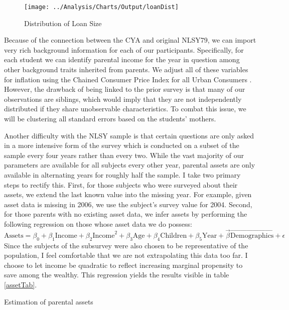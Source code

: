 \documentclass[12pt]{article}
\begin{document}
	\begin{figure}
		\centering
		\caption{Distribution of Loan Size}
		\label{loanDist}
		\texttt{[image: ../Analysis/Charts/Output/loanDist]}
	\end{figure}

	
	Because of the connection between the CYA and original NLSY79, we can import very rich background information for each of our participants. Specifically, for each student we can identify parental income for the year in question among other background traits inherited from parents. We adjust all of these variables for inflation using the Chained Consumer Price Index for all Urban Consumers \parencite{bls2019}. However, the drawback of being linked to the prior survey is that many of our observations are siblings, which would imply that they are not independently distributed if they share unobservable characteristics. To combat this issue, we will be clustering all standard errors based on the students' mothers. 
	
	Another difficulty with the NLSY sample is that certain questions are only asked in a more intensive form of the survey which is conducted on a subset of the sample every four years rather than every two. While the vast majority of our parameters are available for all subjects every other year, parental assets are only available in alternating years for roughly half the sample. I take two primary steps to rectify this. First, for those subjects who were surveyed about their assets, we extend the last known value into the missing year. For example, given asset data is missing in 2006, we use the subject's survey value for 2004. Second, for those parents with no existing asset data, we infer assets by performing the following regression on those whose asset data we do possess: $$\mbox{Assets} = \beta_0 + \beta_1 \mbox{Income} + \beta_2 \mbox{Income}^2 + \beta_3 \mbox{Age} + \beta_4 \mbox{Children} + \beta_5 \mbox{Year} + \vec{\beta} \vec{\mbox{Demographics}} + \epsilon$$ Since the subjects of the subsurvey were also chosen to be representative of the population, I feel comfortable that we are not extrapolating this data too far. I choose to let income be quadratic to reflect increasing marginal propensity to save among the wealthy. This regression yields the results visible in table \ref{assetTab}.
	
	\begin{table}
		\centering
		\caption{Estimation of parental assets}
		
		\label{assetTab}
	\end{table}
\end{document}
